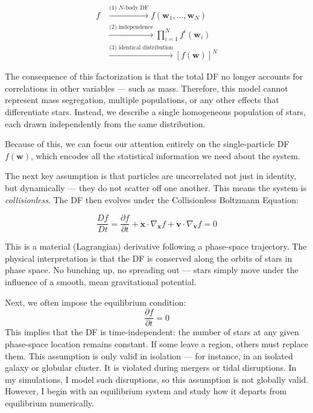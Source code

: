         \[
        \begin{array}{rl}
        f 
        & \stackrel{\text{(1) $N$-body DF}}{\longrightarrow} 
        f(\mathbf{w}_1, \dots, \mathbf{w}_N) \\[2ex]
        & \stackrel{\text{(2) independence}}{\longrightarrow} 
        \prod_{i=1}^N f^i(\mathbf{w}_i) \\[2ex]
        & \stackrel{\text{(3) identical distribution}}{\longrightarrow} 
        \left[ f(\mathbf{w}) \right]^N
        \end{array}
        \]

        The consequence of this factorization is that the total DF no longer accounts for correlations in other variables — such as mass. Therefore, this model cannot represent mass segregation, multiple populations, or any other effects that differentiate stars. Instead, we describe a single homogeneous population of stars, each drawn independently from the same distribution.

        Because of this, we can focus our attention entirely on the single-particle DF \( f(\mathbf{w}) \), which encodes all the statistical information we need about the system.

        The next key assumption is that particles are uncorrelated not just in identity, but dynamically — they do not scatter off one another. This means the system is \textit{collisionless}. The DF then evolves under the Collisionless Boltzmann Equation:

        \begin{equation}
        \frac{Df}{Dt} = \frac{\partial f}{\partial t} + \dot{\mathbf{x}} \cdot \nabla_{\mathbf{x}} f + \dot{\mathbf{v}} \cdot \nabla_{\mathbf{v}} f = 0
        \end{equation}

        This is a material (Lagrangian) derivative following a phase-space trajectory. The physical interpretation is that the DF is conserved along the orbits of stars in phase space. No bunching up, no spreading out — stars simply move under the influence of a smooth, mean gravitational potential.

        Next, we often impose the equilibrium condition:
        \[
        \frac{\partial f}{\partial t} = 0
        \]
        This implies that the DF is time-independent: the number of stars at any given phase-space location remains constant. If some leave a region, others must replace them. This assumption is only valid in isolation — for instance, in an isolated galaxy or globular cluster. It is violated during mergers or tidal disruptions. In my simulations, I model such disruptions, so this assumption is not globally valid. However, I begin with an equilibrium system and study how it departs from equilibrium numerically.

